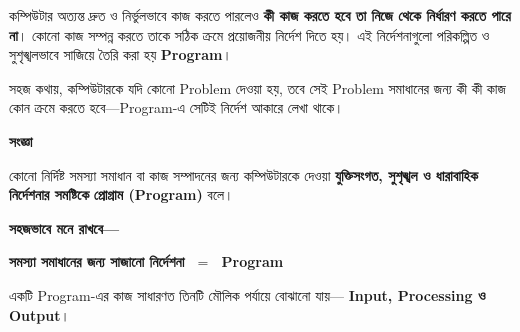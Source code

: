 
কম্পিউটার অত্যন্ত দ্রুত ও নির্ভুলভাবে কাজ করতে পারলেও
\textbf{কী কাজ করতে হবে তা নিজে থেকে নির্ধারণ করতে পারে না}।
কোনো কাজ সম্পন্ন করতে তাকে সঠিক ক্রমে প্রয়োজনীয় নির্দেশ দিতে হয়।
এই নির্দেশনাগুলো পরিকল্পিত ও সুশৃঙ্খলভাবে সাজিয়ে তৈরি করা হয়
\textbf{Program}।

সহজ কথায়, কম্পিউটারকে যদি কোনো Problem দেওয়া হয়, তবে সেই Problem
সমাধানের জন্য কী কী কাজ কোন ক্রমে করতে হবে—Program-এ সেটিই
নির্দেশ আকারে লেখা থাকে।


\begin{definitionbox}

\textbf{\color{darkTeal}সংজ্ঞা}

কোনো নির্দিষ্ট সমস্যা সমাধান বা কাজ সম্পাদনের জন্য কম্পিউটারকে
দেওয়া \textbf{যুক্তিসংগত, সুশৃঙ্খল ও ধারাবাহিক নির্দেশনার সমষ্টিকে}
\textbf{প্রোগ্রাম (Program)} বলে।

\end{definitionbox}

\textbf{সহজভাবে মনে রাখবে—}

\begin{center}
\textbf{
সমস্যা সমাধানের জন্য সাজানো নির্দেশনা
\(\;=\;\)
Program
}
\end{center}


একটি Program-এর কাজ সাধারণত তিনটি মৌলিক পর্যায়ে বোঝানো যায়—
\textbf{Input, Processing ও Output}।

\begin{center}


\end{center}

